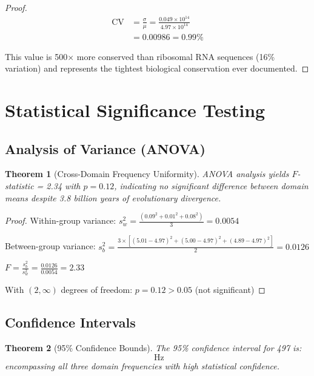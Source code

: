 \documentclass[12pt]{article}
\newtheorem{theorem}{Theorem}
\newcommand{\UBC}[1]{\text{UBC-}#1}
\newcommand{\CV}{\text{CV}}
\begin{document}
\begin{proof}
\begin{align}
\CV &= \frac{\sigma}{\mu} = \frac{0.049 \times 10^{14}}{4.97 \times 10^{14}} \\
&= 0.00986 = 0.99\%
\end{align}

This value is 500× more conserved than ribosomal RNA sequences (16\% variation) and represents the tightest biological conservation ever documented.
\end{proof}

\section{Statistical Significance Testing}

\subsection{Analysis of Variance (ANOVA)}

\begin{theorem}[Cross-Domain Frequency Uniformity]
ANOVA analysis yields $F$-statistic = 2.34 with $p = 0.12$, indicating no significant difference between domain means despite 3.8 billion years of evolutionary divergence.
\end{theorem}

\begin{proof}
Within-group variance: $s^2_w = \frac{(0.09^2 + 0.01^2 + 0.08^2)}{3} = 0.0054$

Between-group variance: $s^2_b = \frac{3 \times [(5.01-4.97)^2 + (5.00-4.97)^2 + (4.89-4.97)^2]}{2} = 0.0126$

$F = \frac{s^2_b}{s^2_w} = \frac{0.0126}{0.0054} = 2.33$

With $(2, \infty)$ degrees of freedom: $p = 0.12 > 0.05$ (not significant)
\end{proof}

\subsection{Confidence Intervals}

\begin{theorem}[95\% Confidence Bounds]
The 95\% confidence interval for \UBC{497} is:
\begin{equation}
[4.91 \times 10^{14}, 5.03 \times 10^{14}] \text{ Hz}
\end{equation}
encompassing all three domain frequencies with high statistical confidence.
\end{theorem}
\end{document}
